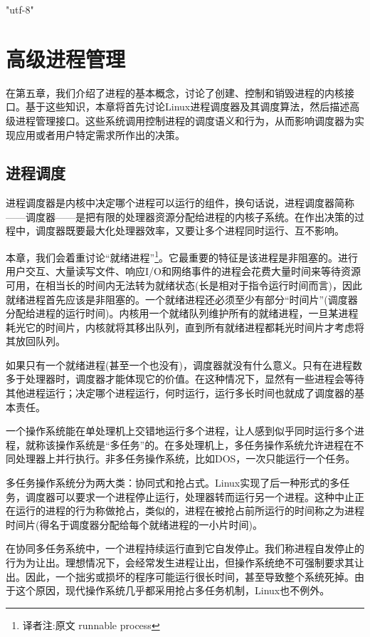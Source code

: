 \ifx\atempxetex\usewhat
\XeTeXinputencoding "utf-8"
\fi
{}

\chapter{高级进程管理}

在第五章，我们介绍了进程的基本概念，讨论了创建、控制和销毁进程的内核接口。基于这些知识，本章将首先讨论Linux进程调度器及其调度算法，然后描述高级进程管理接口。这些系统调用控制进程的调度语义和行为，从而影响调度器为实现应用或者用户特定需求所作出的决策。

\section{进程调度}

进程调度器是内核中决定哪个进程可以运行的组件，换句话说，进程调度器简称------调度器------是把有限的处理器资源分配给进程的内核子系统。在作出决策的过程中，调度器既要最大化处理器效率，又要让多个进程同时运行、互不影响。

本章，我们会着重讨论“就绪进程”\footnote[1]{译者注:原文 runnable process}。它最重要的特征是该进程是非阻塞的。进行用户交互、大量读写文件、响应I/O和网络事件的进程会花费大量时间来等待资源可用，在相当长的时间内无法转为就绪状态(长是相对于指令运行时间而言)，因此就绪进程首先应该是非阻塞的。一个就绪进程还必须至少有部分“时间片”(调度器分配给进程的运行时间)。内核用一个就绪队列维护所有的就绪进程，一旦某进程耗光它的时间片，内核就将其移出队列，直到所有就绪进程都耗光时间片才考虑将其放回队列。

如果只有一个就绪进程(甚至一个也没有)，调度器就没有什么意义。只有在进程数多于处理器时，调度器才能体现它的价值。在这种情况下，显然有一些进程会等待其他进程运行；决定哪个进程运行，何时运行，运行多长时间也就成了调度器的基本责任。

一个操作系统能在单处理机上交错地运行多个进程，让人感到似乎同时运行多个进程，就称该操作系统是“多任务”的。在多处理机上，多任务操作系统允许进程在不同处理器上并行执行。非多任务操作系统，比如DOS，一次只能运行一个任务。

多任务操作系统分为两大类：协同式和抢占式。Linux实现了后一种形式的多任务，调度器可以要求一个进程停止运行，处理器转而运行另一个进程。这种中止正在运行的进程的行为称做抢占，类似的，进程在被抢占前所运行的时间称之为进程时间片(得名于调度器分配给每个就绪进程的一小片时间)。

在协同多任务系统中，一个进程持续运行直到它自发停止。我们称进程自发停止的行为为让出。理想情况下，会经常发生进程让出，但操作系统绝不可强制要求其让出。因此，一个拙劣或损坏的程序可能运行很长时间，甚至导致整个系统死掉。由于这个原因，现代操作系统几乎都采用抢占多任务机制，Linux也不例外。

